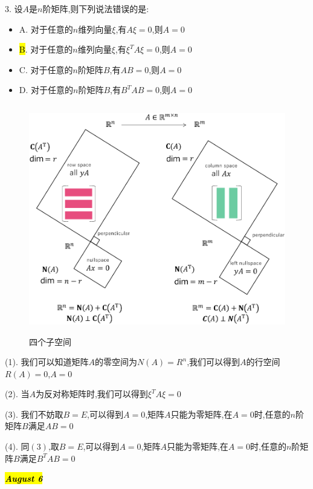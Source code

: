3. 设$A$是$n$阶矩阵,则下列说法错误的是:  
\begin{itemize}
	\item A. 对于任意的$n$维列向量$\xi$,有$A\xi=0$,则$A=0$
	\item \hl{B}. 对于任意的$n$维列向量$\xi$,有$\xi^{T}A\xi=0$,则$A=0$
	\item C. 对于任意的$n$阶矩阵$B$,有$AB=0$,则$A=0$
	\item D. 对于任意的$n$阶矩阵$B$,有$B^{T}AB=0$,则$A=0$
\end{itemize}
\begin{figure}[ht]
	\centering
	\includegraphics[width=13cm,height=10cm]{"figure/Question/四个子空间.pdf"}
	\caption{四个子空间}
\end{figure} 
\begin{solution}

	(1). 我们可以知道矩阵$A$的零空间为$N(A)=R^{n}$,我们可以得到$A$的行空间$R(A)=0$,$A=0$
	
	(2). 当$A$为反对称矩阵时,我们可以得到$\xi^{T}A\xi=0$
	
	(3). 我们不妨取$B=E$,可以得到$A=0$,矩阵$A$只能为零矩阵,在$A=0$时,任意的$n$阶矩阵$B$满足$AB=0$
	
	(4). 同$(3)$,取$B=E$,可以得到$A=0$,矩阵$A$只能为零矩阵,在$A=0$时,任意的$n$阶矩阵$B$满足$B^{T}AB=0$
\end{solution}

\hl{\textbf{\textit{August 6}}}

